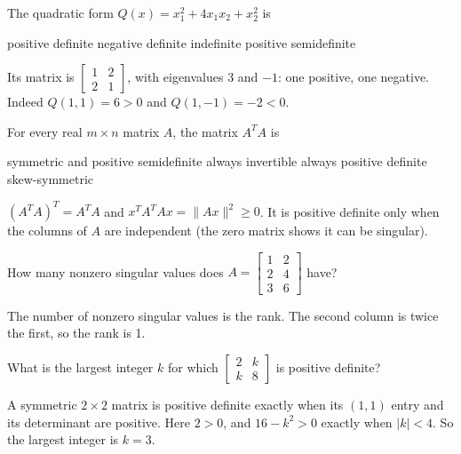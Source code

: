 \begin{question}[id=sym-6, marks=2]
The quadratic form $Q(x) = x_1^2 + 4x_1x_2 + x_2^2$ is
\begin{options}
  \option positive definite
  \option negative definite
  \correct indefinite
  \option positive semidefinite
\end{options}
\begin{solution}
Its matrix is $\begin{bmatrix} 1 & 2 \\ 2 & 1 \end{bmatrix}$, with eigenvalues 3 and $-1$: one positive, one negative. Indeed $Q(1, 1) = 6 > 0$ and $Q(1, -1) = -2 < 0$.
\end{solution}
\end{question}

\begin{question}[id=sym-7]
For every real $m \times n$ matrix $A$, the matrix $A^TA$ is
\begin{options}
  \correct symmetric and positive semidefinite
  \option always invertible
  \option always positive definite
  \option skew-symmetric
\end{options}
\begin{solution}
$(A^TA)^T = A^TA$ and $x^TA^TAx = \|Ax\|^2 \ge 0$. It is positive definite only when the columns of $A$ are independent (the zero matrix shows it can be singular).
\end{solution}
\end{question}

\begin{question}[id=sym-8]
How many nonzero singular values does $A = \begin{bmatrix} 1 & 2 \\ 2 & 4 \\ 3 & 6 \end{bmatrix}$ have?
\begin{solution}
The number of nonzero singular values is the rank. The second column is twice the first, so the rank is 1.
\end{solution}
\end{question}

\begin{question}[id=sym-9, marks=2]
What is the largest integer $k$ for which $\begin{bmatrix} 2 & k \\ k & 8 \end{bmatrix}$ is positive definite?
\begin{solution}
A symmetric $2 \times 2$ matrix is positive definite exactly when its $(1,1)$ entry and its determinant are positive. Here $2 > 0$, and $16 - k^2 > 0$ exactly when $|k| < 4$. So the largest integer is $k = 3$.
\end{solution}
\end{question}

